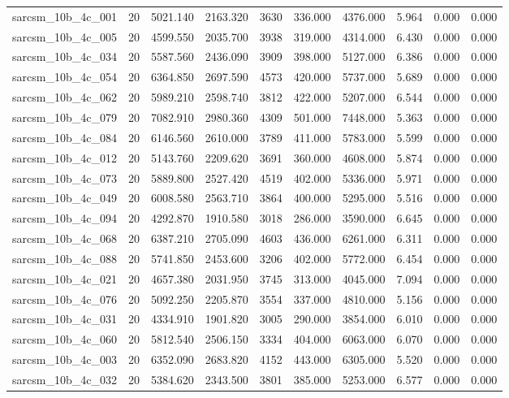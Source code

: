 \begin{tabular}{lrrrrrrrrr}
sarcsm\_10b\_4c\_001 & 20 & 5021.140 & 2163.320 & 3630 & 336.000 & 4376.000 & 5.964 & 0.000 & 0.000 \\
sarcsm\_10b\_4c\_005 & 20 & 4599.550 & 2035.700 & 3938 & 319.000 & 4314.000 & 6.430 & 0.000 & 0.000 \\
sarcsm\_10b\_4c\_034 & 20 & 5587.560 & 2436.090 & 3909 & 398.000 & 5127.000 & 6.386 & 0.000 & 0.000 \\
sarcsm\_10b\_4c\_054 & 20 & 6364.850 & 2697.590 & 4573 & 420.000 & 5737.000 & 5.689 & 0.000 & 0.000 \\
sarcsm\_10b\_4c\_062 & 20 & 5989.210 & 2598.740 & 3812 & 422.000 & 5207.000 & 6.544 & 0.000 & 0.000 \\
sarcsm\_10b\_4c\_079 & 20 & 7082.910 & 2980.360 & 4309 & 501.000 & 7448.000 & 5.363 & 0.000 & 0.000 \\
sarcsm\_10b\_4c\_084 & 20 & 6146.560 & 2610.000 & 3789 & 411.000 & 5783.000 & 5.599 & 0.000 & 0.000 \\
sarcsm\_10b\_4c\_012 & 20 & 5143.760 & 2209.620 & 3691 & 360.000 & 4608.000 & 5.874 & 0.000 & 0.000 \\
sarcsm\_10b\_4c\_073 & 20 & 5889.800 & 2527.420 & 4519 & 402.000 & 5336.000 & 5.971 & 0.000 & 0.000 \\
sarcsm\_10b\_4c\_049 & 20 & 6008.580 & 2563.710 & 3864 & 400.000 & 5295.000 & 5.516 & 0.000 & 0.000 \\
sarcsm\_10b\_4c\_094 & 20 & 4292.870 & 1910.580 & 3018 & 286.000 & 3590.000 & 6.645 & 0.000 & 0.000 \\
sarcsm\_10b\_4c\_068 & 20 & 6387.210 & 2705.090 & 4603 & 436.000 & 6261.000 & 6.311 & 0.000 & 0.000 \\
sarcsm\_10b\_4c\_088 & 20 & 5741.850 & 2453.600 & 3206 & 402.000 & 5772.000 & 6.454 & 0.000 & 0.000 \\
sarcsm\_10b\_4c\_021 & 20 & 4657.380 & 2031.950 & 3745 & 313.000 & 4045.000 & 7.094 & 0.000 & 0.000 \\
sarcsm\_10b\_4c\_076 & 20 & 5092.250 & 2205.870 & 3554 & 337.000 & 4810.000 & 5.156 & 0.000 & 0.000 \\
sarcsm\_10b\_4c\_031 & 20 & 4334.910 & 1901.820 & 3005 & 290.000 & 3854.000 & 6.010 & 0.000 & 0.000 \\
sarcsm\_10b\_4c\_060 & 20 & 5812.540 & 2506.150 & 3334 & 404.000 & 6063.000 & 6.070 & 0.000 & 0.000 \\
sarcsm\_10b\_4c\_003 & 20 & 6352.090 & 2683.820 & 4152 & 443.000 & 6305.000 & 5.520 & 0.000 & 0.000 \\
sarcsm\_10b\_4c\_032 & 20 & 5384.620 & 2343.500 & 3801 & 385.000 & 5253.000 & 6.577 & 0.000 & 0.000 \\

\end{tabular}
